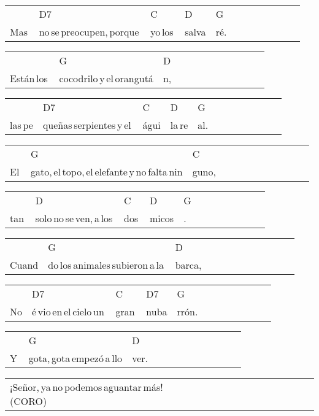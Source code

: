 \begin{multicols}{2}
\begin{minipage}{\columnwidth}
\noindent
\begin{tabular}{llllllllllll}
&D7&C&D&G\\
Mas\,&no\,se\,preocupen,\,porque\,&yo\,los\,&salva&ré.\\\hline
\end{tabular}

\noindent
\begin{tabular}{llllllllllll}
&G&D\\
Están\,los\,&cocodrilo\,y\,el\,orangutá&n,
\end{tabular}

\noindent
\begin{tabular}{llllllllllll}
&D7&C&D&G\\
las\,pe&queñas\,serpientes\,y\,el\,&águi&la\,re&al.
\end{tabular}

\noindent
\begin{tabular}{llllllllllll}
&G&C\\
El\,&gato,\,el\,topo,\,el\,elefante\,y\,no\,falta\,nin&guno,
\end{tabular}

\noindent
\begin{tabular}{llllllllllll}
&D&C&D&G\\
tan\,&solo\,no\,se\,ven,\,a\,los\,&dos\,&micos&.\\\hline
\end{tabular}

\noindent
\begin{tabular}{llllllllllll}
&G&D\\
Cuand&do\,los\,animales\,subieron\,a\,la\,&barca,
\end{tabular}

\noindent
\begin{tabular}{llllllllllll}
&D7&C&D7&G\\
No&é\,vio\,en\,el\,cielo\,un\,&gran\,&nuba&rrón.
\end{tabular}

\noindent
\begin{tabular}{llllllllllll}
&G&D\\
Y\,&gota,\,gota\,empezó\,a\,llo&ver.
\end{tabular}

\noindent
\begin{tabular}{llllllllllll}
\\
¡Señor,\,ya\,no\,podemos\,aguantar\,más!\,(CORO)
\end{tabular}
\end{minipage}\\


\end{multicols}
